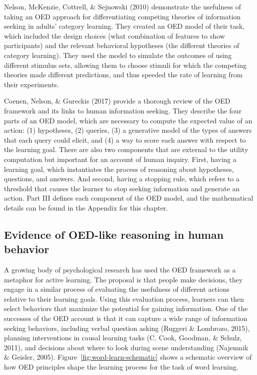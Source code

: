 \documentclass[oneside]{report}
\begin{document}
Nelson, McKenzie, Cottrell, \& Sejnowski (2010) demonstrate the
usefulness of taking an OED approach for differentiating competing
theories of information seeking in adults' category learning. They
created an OED model of their task, which included the design choices
(what combination of features to show participants) and the relevant
behavioral hypotheses (the different theories of category learning).
They used the model to simulate the outcomes of using different stimulus
sets, allowing them to choose stimuli for which the competing theories
made different predictions, and thus speeded the rate of learning from
their experiments.

Coenen, Nelson, \& Gureckis (2017) provide a thorough review of the OED
framework and its links to human information seeking. They describe the
four parts of an OED model, which are necessary to compute the expected
value of an action: (1) hypotheses, (2) queries, (3) a generative model
of the types of answers that each query could elicit, and (4) a way to
score each answer with respect to the learning goal. There are also two
components that are external to the utility computation but important
for an account of human inquiry. First, having a learning goal, which
instantiates the process of reasoning about hypotheses, questions, and
answers. And second, having a stopping rule, which refers to a threshold
that causes the learner to stop seeking information and generate an
action. Part III defines each component of the OED model, and the
mathematical details can be found in the Appendix for this chapter.

\subsection{Evidence of OED-like reasoning in human
behavior}\label{evidence-of-oed-like-reasoning-in-human-behavior}

A growing body of psychological research has used the OED framework as a
metaphor for active learning. The proposal is that people make
decisions, they engage in a similar process of evaluating the usefulness
of different actions relative to their learning goals. Using this
evaluation process, learners can then select behaviors that maximize the
potential for gaining information. One of the successes of the OED
account is that it can capture a wide range of information seeking
behaviors, including verbal question asking (Ruggeri \& Lombrozo, 2015),
planning interventions in causal learning tasks (C. Cook, Goodman, \&
Schulz, 2011), and decisions about where to look during scene
understanding (Najemnik \& Geisler, 2005).
Figure~\ref{fig:word-learn-schematic} shows a schematic overview of how
OED principles shape the learning process for the task of word learning.
\end{document}
